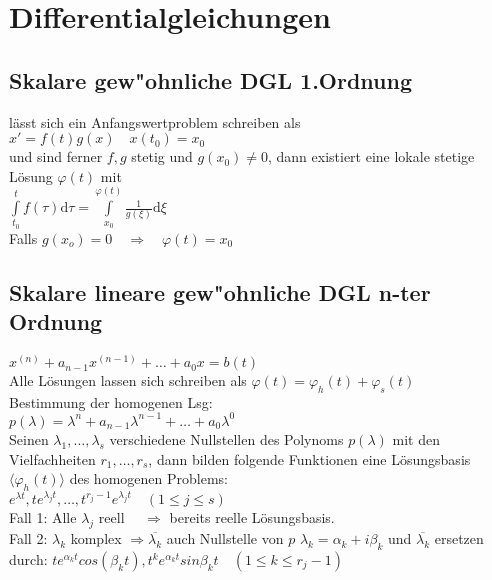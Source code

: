 \documentclass[10pt,a4paper^, twocolumn]{article}
\renewcommand{\phi}{\varphi} %
\renewcommand{\d}{\mathrm{d}} %
\begin{document}
\section{Differentialgleichungen}
\subsection{Skalare gew"ohnliche DGL 1.Ordnung}
lässt sich ein Anfangswertproblem schreiben als \\ $x' = f(t)g(x) \quad x(t_0) = x_0$  \\
und sind ferner $f,g$ stetig und $g(x_0) \neq 0$, dann existiert eine lokale stetige Lösung $\phi(t)$ mit \\
$\int\limits_{t_0}^t f(\tau) \d \tau = \int\limits_{x_0}^{\phi(t)} \frac{1}{g(\xi)} \d \xi$ \\
Falls $g(x_o) = 0  \quad \Rightarrow \quad \phi(t) = x_0$

\subsection{Skalare lineare gew"ohnliche DGL n-ter Ordnung}
$x^{(n)} + a_{n-1}x^{(n-1)} + \dots + a_0x = b(t)$ \\
Alle Lösungen lassen sich schreiben als $\phi(t) = \phi_h(t) + \phi_s(t)$ \\
Bestimmung der homogenen Lsg: \\
$p(\lambda) = \lambda^n + a_{n-1}\lambda^{n-1} + \dots + a_0\lambda^0$  \\
Seinen $\lambda_1,\dots,\lambda_s$ verschiedene Nullstellen des Polynoms $p(\lambda)$ mit den Vielfachheiten $r_1,\dots,r_s$,
dann bilden folgende Funktionen eine Lösungsbasis $\langle \phi_h(t) \rangle$ des homogenen Problems: \\
$e^{\lambda t}, te^{\lambda_jt},\dots,t^{r_j-1}e^{\lambda_jt} \quad ( 1 \leq j \leq s )$ \\
Fall 1: Alle $\lambda_j$ reell $\quad \Rightarrow$ bereits reelle Lösungsbasis. \\
Fall 2: $\lambda_k$ komplex $\Rightarrow \overline{\lambda_k}$ auch Nullstelle von $p$
	$\lambda_k = \alpha_k + i\beta_k$ und $\overline{\lambda_k}$ ersetzen durch: 
	$te^{\alpha_kt}cos(\beta_kt), t^ke^{\alpha_kt}sin{\beta_kt} \quad (1 \leq k \leq r_j-1)$
\end{document}
